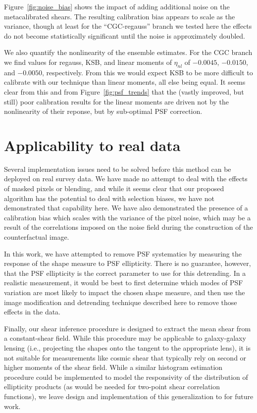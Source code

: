 \documentclass[iop]{emulateapj}
\begin{document}
Figure~\ref{fig:noise_bias} shows the impact of adding additional
noise on the metacalibrated shears. The resulting calibration bias
appears to scale as the variance, though at least for the
``CGC-regauss'' branch we tested here the effects do not become
statistically significant until the noise is approximately doubled.


We also quantify the nonlinearity of the ensemble estimates. For the
CGC branch we find values for regauss, KSB, and linear moments of
$\eta_{nl}$ of $-0.0045$, $-0.0150$, and $-0.0050$, respectively. From
this we would expect KSB to be more difficult to calibrate with our
technique than linear moments, all else being equal. It seems clear
from this and from Figure~\ref{fig:psf_trends} that the (vastly improved,
but still) poor calibration results for the linear moments are driven
not by the nonlinearity of their reponse, but by sub-optimal PSF
correction.

\section{Applicability to real data}
Several implementation issues need to be solved before this method can
be deployed on real survey data. We have made no attempt to deal with
the effects of masked pixels or blending, and while it seems clear
that our proposed algorithm has the potential to deal with selection
biases, we have not demonstrated that capability here. We have also
demonstrated the presence of a calibration bias which scales with the
variance of the pixel noise, which may be a result of the correlations
imposed on the noise field during the construction of the
counterfactual image.

In this work, we have attempted to remove PSF systematics by measuring
the response of the shape measure to PSF ellipticity. There is no
guarantee, however, that the PSF ellipticity is the correct parameter
to use for this detrending. In a realistic measurement, it would be
best to first determine which modes of PSF variation are most likely
to impact the chosen shape measure, and then use the image
modification and detrending technique described here to remove those
effects in the data.

Finally, our shear inference procedure is designed to extract the mean
shear from a constant-shear field. While this procedure may be
applicable to galaxy-galaxy lensing (i.e., projecting the shapes onto
the tangent to the appropriate lens), it is not suitable for
measurements like cosmic shear that typically rely on second or higher
moments of the shear field. While a similar histogram estimation
procedure could be implemented to model the responsivity of the
distribution of ellipticity products (as would be needed for two-point
shear correlation functions), we leave design and implementation of
this generalization to for future work.
\end{document}
